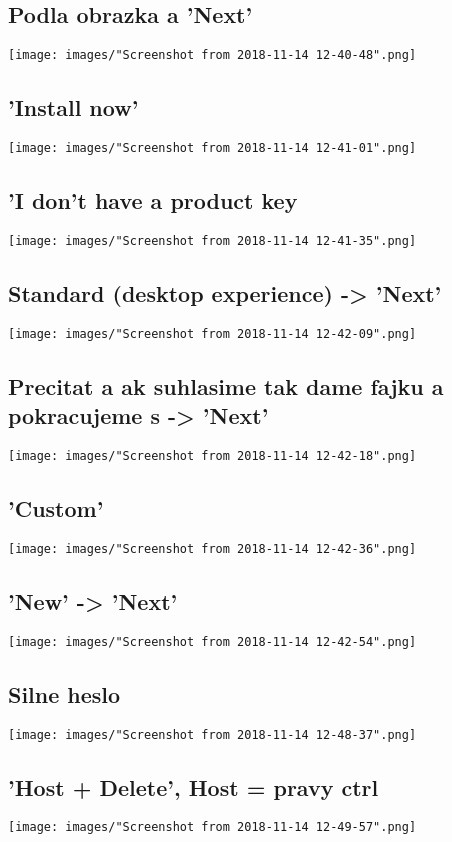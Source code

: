 \documentclass[slovak]{article}
\begin{document}
  \subsection{Podla obrazka a 'Next'}
  \texttt{[image: images/"Screenshot from 2018-11-14 12-40-48".png]}
  \subsection{'Install now'}
  \texttt{[image: images/"Screenshot from 2018-11-14 12-41-01".png]}
  \subsection{'I don't have a product key}
  \texttt{[image: images/"Screenshot from 2018-11-14 12-41-35".png]}
  \subsection{Standard (desktop experience) -> 'Next'}
  \texttt{[image: images/"Screenshot from 2018-11-14 12-42-09".png]}
  \subsection{Precitat a ak suhlasime tak dame fajku a pokracujeme s -> 'Next'}
  \texttt{[image: images/"Screenshot from 2018-11-14 12-42-18".png]}
  \subsection{'Custom'}
  \texttt{[image: images/"Screenshot from 2018-11-14 12-42-36".png]}
  \subsection{'New' -> 'Next'}
  \texttt{[image: images/"Screenshot from 2018-11-14 12-42-54".png]}
  \subsection{Silne heslo}
  \texttt{[image: images/"Screenshot from 2018-11-14 12-48-37".png]}
  \subsection{'Host + Delete', Host = pravy ctrl}
  \texttt{[image: images/"Screenshot from 2018-11-14 12-49-57".png]}
\end{document}

